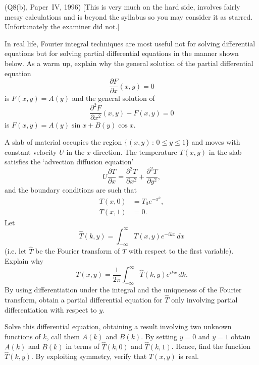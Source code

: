 \begin{question}(Q8(b), Paper~IV, 1996) [This is very much
on the hard side, involves fairly messy calculations
and is beyond the syllabus so you may consider it as
starred. Unfortunately the examiner did not.]

In real life, Fourier integral techniques are most useful
not for solving differential equations but for solving
partial differential equations in the manner shown below.
As a warm up, explain why the general solution of the
partial differential equation
\[\frac{\partial F}{\partial x}(x,y)=0\]
is $F(x,y)=A(y)$ and the general solution of
\[\frac{\partial^{2} F}{\partial x^{2}}(x,y)+F(x,y)=0\]
is $F(x,y)=A(y)\sin x+B(y)\cos x$.

A slab of material occupies the region $\{(x,y)\,:\,0\leq y\leq 1\}$
and moves with constant velocity $U$ in the $x$-direction.
The temperature $T(x,y)$ in the slab satisfies the
`advection diffusion equation'
\[U\frac{\partial T}{\partial x}=
\frac{\partial^{2} T}{\partial x^{2}}
+\frac{\partial^{2} T}{\partial y^{2}},\]
and the boundary conditions are such that
\begin{align*}
T(x,0)&=T_{0}e^{-x^{2}},\\
T(x,1)&=0.
\end{align*}
Let
\[\hat{T}(k,y)=\int_{-\infty}^{\infty}T(x,y)e^{-ikx}\,dx\]
(i.e. let $\hat{T}$ be the Fourier transform of $T$
with respect to the first variable). Explain why
\[T(x,y)=\frac{1}{2\pi}
\int_{-\infty}^{\infty}\hat{T}(k,y)e^{ikx}\,dk.\]
By using differentiation under the integral and the
uniqueness of the Fourier transform, obtain
a partial differential equation for $\hat{T}$
only involving partial differentiation with respect
to $y$.

Solve this differential equation, obtaining a result
involving two unknown functions of $k$, call them
$A(k)$ and $B(k)$. By setting $y=0$ and $y=1$
obtain $A(k)$ and $B(k)$ in terms of $\hat{T}(k,0)$  
and $\hat{T}(k,1)$. Hence, find the function $\hat{T}(k,y)$.
By exploiting symmetry, verify that $T(x,y)$ is real.
\end{question}
